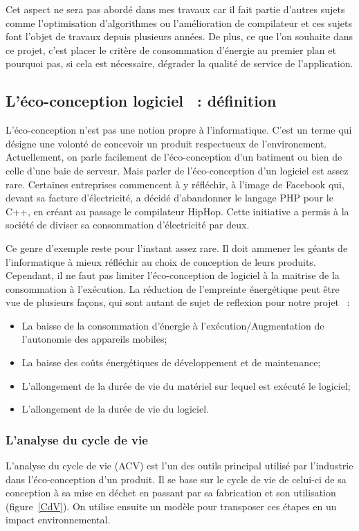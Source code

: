 \documentclass[a4paper, 11pt]{report}
\begin{document}
Cet aspect ne sera pas abordé dans mes travaux car il fait partie d'autres sujets comme l'optimisation d'algorithmes ou l'amélioration de compilateur et  ces sujets font l'objet de travaux depuis plusieurs années. De plus, ce que l'on souhaite dans ce projet, c'est placer le critère de consommation d'énergie au premier plan et pourquoi pas, si cela est nécessaire, dégrader la qualité de service de l'application.
		
		\subsection{L'éco-conception logiciel ~: définition}
L'éco-conception n'est pas une notion propre à l'informatique. C'est un terme qui désigne une volonté de concevoir un produit respectueux de l'environement. Actuellement, on parle facilement de l'éco-conception d'un batiment ou bien de celle d'une baie de serveur. Mais parler de l'éco-conception d'un logiciel est assez rare. Certaines entreprises commencent à y réfléchir, à l'image de Facebook qui, devant sa facture d'électricité, a décidé d'abandonner le langage PHP pour le C++, en créant au passage le compilateur HipHop. Cette initiative a permis à la société de diviser sa consommation d'électricité par deux.

Ce genre d'exemple reste pour l'instant assez rare. Il doit ammener les géants de l'informatique à mieux réfléchir au choix de conception de leurs produits. Cependant, il ne faut pas limiter l'éco-conception de logiciel à la maitrise de la consommation à l'exécution. La réduction de l’empreinte énergétique peut être vue de plusieurs façons, qui sont autant de sujet de reflexion pour notre projet ~:
\begin{itemize}
	\item La baisse de la consommation d’énergie à l'exécution/Augmentation de l’autonomie des appareils mobiles;
	\item La baisse des coûts énergétiques de développement et de maintenance;
	\item L'allongement de la durée de vie du matériel sur lequel est exécuté le logiciel;
	\item L'allongement de la durée de vie du logiciel.
\end{itemize}

			\subsubsection{L'analyse du cycle de vie}
L'analyse du cycle de vie (ACV) est l'un des outils principal utilisé par l'industrie dans l'éco-conception d'un produit. Il se base sur le cycle de vie de celui-ci de sa conception à sa mise en déchet en passant par sa fabrication et son utilisation (figure~\ref{CdV}). On utilise ensuite un modèle pour transposer ces étapes en un impact environnemental.
\end{document}
